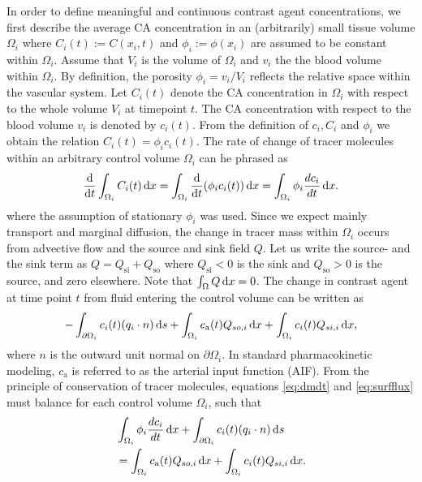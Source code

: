 \documentclass[journal,twocolumn]{IEEEtran}
\newcommand{\Qso}{Q_{\mathrm{so}}}
\newcommand{\Qsi}{Q_{\mathrm{si}}}
\newcommand{\ca}{c_\mathrm{a}}
\newcommand{\sic}{\milli\mol\per\milli\meter\cubed}
\begin{document}
	In order to define meaningful and continuous contrast agent concentrations, we first describe the average CA concentration in an (arbitrarily) small tissue volume $\Omega_i$ where $C_i(t):= C(x_i,t)$ and $\phi_i := \phi(x_i)$ are assumed to be constant within $\Omega_i$.
	Assume that $V_i$ is the volume of $\Omega_i$ and $v_i$ the the blood volume within $\Omega_i$.
	By definition, the porosity $\phi_i = v_i/V_i$ reflects the relative space within the vascular system.
	Let $C_i(t)$ denote the CA concentration in $\Omega_i$ with respect to the whole volume $V_i$ at timepoint $t$.
	The CA concentration with respect to the blood volume $v_i$ is denoted by $c_i(t)$.
	From the definition of $c_i,C_i$ and $\phi_i$ we obtain the relation $C_i(t) = \phi_i  c_i(t)$.
	The rate of change of tracer molecules within an arbitrary control volume $\Omega_i$ can he phrased as
	\begin{equation}
		\diffop{t}\int_{\Omega_i}C_i(t) \diffint x = \int_{\Omega_i}\diffop{t}(\phi_i c_i(t)) \diffint x = \int_{\Omega_i} \phi_i \frac{d c_i}{dt}\diffint x.
		\label{eq:dmdt}
	\end{equation}	
	where the assumption of stationary $\phi_i$ was used.
	Since we expect mainly transport and marginal diffusion, the change in tracer mass within $\Omega_i$ occurs from advective flow and the source and sink field $Q$.
	Let us write the source- and the sink term as $Q = \Qsi + \Qso$ where $\Qsi < 0$ is the sink and $\Qso > 0$ is the source, and zero elsewhere. 
	Note that $\int_\Omega Q \,\mathrm{d} x = 0$. 
	The change in contrast agent at time point $t$ from fluid entering the control volume can be written as
	\begin{equation}
		-\int_{ \partial \Omega_i}c_i(t)(q_i \cdot n)\diffint s + \int_{\Omega_i}\ca(t) Q_{so,i} \diffint x + \int_{\Omega_i}c_i(t)Q_{si,i} \diffint x,
		\label{eq:surfflux}
	\end{equation}
	where $n$ is the outward unit normal on $\partial \Omega_i$.
	In standard pharmacokinetic modeling, $\ca$ is referred to as the arterial input function (AIF).
	From the principle of conservation of tracer molecules, equations \eqref{eq:dmdt} and \eqref{eq:surfflux} must balance for each control volume $\Omega_i$, such that
	\begin{align}
		& \int_{\Omega_i} \phi_i \frac{d c_i}{dt} \diffint x + \int_{ \partial \Omega_i}c_i(t)(q_i \cdot n) \diffint s \nonumber \\
		& = \int_{\Omega_i}\ca(t)Q_{so,i} \diffint x + \int_{\Omega_i}c_i(t) Q_{si,i} \diffint x.
		\label{eq:conteq}
	\end{align}
\end{document}
